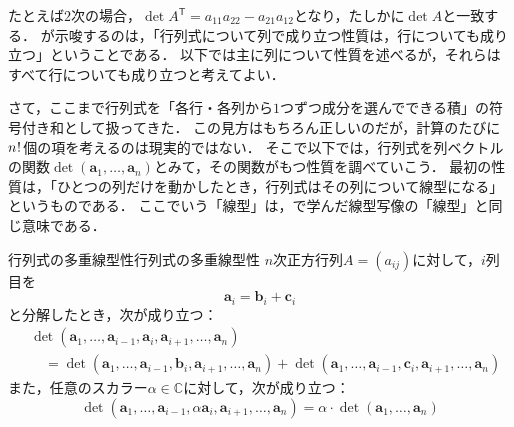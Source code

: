たとえば$2$次の場合，$\det A^\mathsf{T} = a_{11}a_{22} - a_{21}a_{12}$となり，たしかに$\det A$と一致する．
が示唆するのは，「行列式について列で成り立つ性質は，行についても成り立つ」ということである．
以下では主に列について性質を述べるが，それらはすべて行についても成り立つと考えてよい．

さて，ここまで行列式を「各行・各列から$1$つずつ成分を選んでできる積」の符号付き和として扱ってきた．
この見方はもちろん正しいのだが，計算のたびに$n\mkern1mu!\mkern1mu$個の項を考えるのは現実的ではない．
そこで以下では，行列式を列ベクトルの関数$\det(\bm{a}_1, \dots, \bm{a}_n)$とみて，その関数がもつ性質を調べていこう．
最初の性質は，「ひとつの列だけを動かしたとき，行列式はその列について線型になる」というものである．
ここでいう「線型」は，で学んだ線型写像の「線型」と同じ意味である．

\begin{prop}{行列式の多重線型性}{行列式の多重線型性}
  $n$次正方行列$A = (a_{ij})$に対して，$i$列目を
  \[
  \bm{a}_i = \bm{b}_i + \bm{c}_i
  \]
  と分解したとき，次が成り立つ：
  \begin{align*}
  &\det(\bm{a}_1, \dots, \bm{a}_{i-1}, \bm{a}_i, \bm{a}_{i+1}, \dots, \bm{a}_n) \\
  &\quad = \det(\bm{a}_1, \dots, \bm{a}_{i-1}, \bm{b}_i, \bm{a}_{i+1}, \dots, \bm{a}_n)
  + \det(\bm{a}_1, \dots, \bm{a}_{i-1}, \bm{c}_i, \bm{a}_{i+1}, \dots, \bm{a}_n)
  \end{align*}
  また，任意のスカラー$\alpha \in \mathbb{C}$に対して，次が成り立つ：
  \[
  \det(\bm{a}_1, \dots, \bm{a}_{i-1}, \alpha \bm{a}_i, \bm{a}_{i+1}, \dots, \bm{a}_n) 
  = \alpha \cdot \det(\bm{a}_1, \dots, \bm{a}_n)
  \]
\end{prop}

